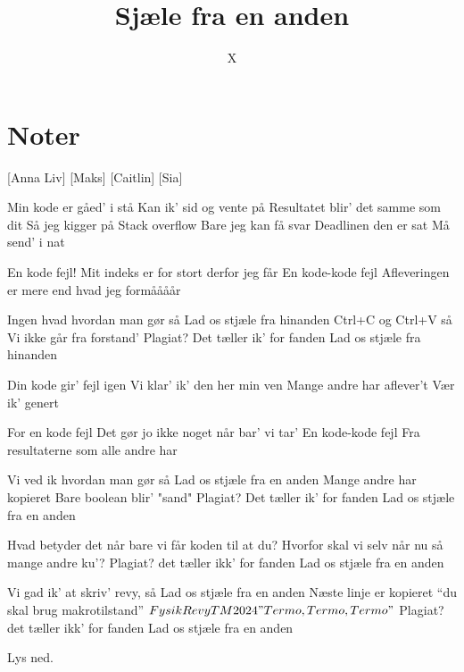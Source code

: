 \documentclass{article}
\title{Sjæle fra en anden}
\author{X}
\begin{document}
                
\maketitle
\section*{Noter}                %
\begin{roles}
[Anna Liv]
[Maks]
[Caitlin]
 [Sia]
\end{roles}

\begin{props}

\prop{} 
\end{props}

\newpage%
\begin{song}

 Min kode er gåed' i stå 
 Kan ik' sid og vente på 
 Resultatet blir' det samme som dit 
 Så jeg kigger på 
 Stack overflow 
 Bare jeg kan få svar 
 Deadlinen den er sat 
Må send' i nat 

 En kode fejl! 
 Mit indeks er for stort derfor jeg får 
 En kode-kode fejl 
 Afleveringen er mere end hvad jeg formåååår 

 Ingen hvad hvordan man gør så 
Lad os stjæle fra hinanden 
Ctrl+C og Ctrl+V så 
Vi ikke går fra forstand' 
Plagiat? Det tæller ik' for fanden 
Lad os stjæle fra hinanden 

 Din kode gir' fejl igen 
 Vi klar' ik' den her min ven 
 Mange andre har aflever't
Vær ik' genert 

 For en kode fejl 
 Det gør jo ikke noget når bar' vi tar' 
 En kode-kode fejl 
 Fra resultaterne som alle andre har 

Vi ved ik hvordan man gør så 
Lad os stjæle fra en anden 
Mange andre har kopieret 
Bare boolean blir' "sand"
Plagiat? Det tæller ik' for fanden 
Lad os stjæle fra en anden

 Hvad betyder det når bare vi får koden til at du?
 Hvorfor skal vi selv når nu så mange andre ku’?
Plagiat? det tæller ikk’ for fanden
Lad os stjæle fra en anden

Vi gad ik’ at skriv’ revy, så
Lad os stjæle fra en anden
Næste linje er kopieret
“du skal brug makrotilstand” $FysikRevy TM 2024 "Termo, Termo, Termo"$
Plagiat? det tæller ikk’ for fanden
Lad os stjæle fra en anden


\scene Lys ned.

\end{song}
\end{document}
